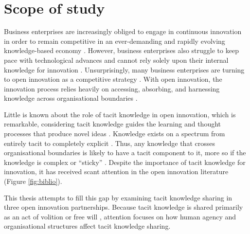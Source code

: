 \section{Scope of study}

Business enterprises are increasingly obliged to engage in continuous innovation in order to remain competitive in an ever-demanding and rapidly evolving knowledge-based economy \citep{lubit2001keys,urbancova2013competitive,lee2019does,jackson2020fostering}. However, business enterprises also struggle to keep pace with technological advances and cannot rely solely upon their internal knowledge for innovation \citep{nunes2020managing}. Unsurprisingly, many business enterprises are turning to open innovation as a competitive strategy \citep{stanko2017under,lee2019does}. With open innovation, the innovation process relies heavily on accessing, absorbing, and harnessing knowledge across organisational boundaries \citep{chesbrough2017future}.\medskip 

Little is known about the role of tacit knowledge in open innovation, which is remarkable, considering tacit knowledge guides the learning and thought processes that produce novel ideas \citep{leonard1998role}. Knowledge exists on a spectrum from entirely tacit to completely explicit \citep{leonard1998role}. Thus, any knowledge that crosses organisational boundaries is likely to have a tacit component to it, more so if the knowledge is complex or \enquote{sticky} \citep{seidler2008use,szulanski2016overcoming}. Despite the importance of tacit knowledge for innovation, it has received scant attention in the open innovation literature (Figure \ref{fig:biblio}).\medskip 

This thesis attempts to fill this gap by examining tacit knowledge sharing in three open innovation partnerships. Because tacit knowledge is shared primarily as an act of volition or free will \citep{polanyi1966tacit}, attention focuses on how human agency and organisational structures affect tacit knowledge sharing.

